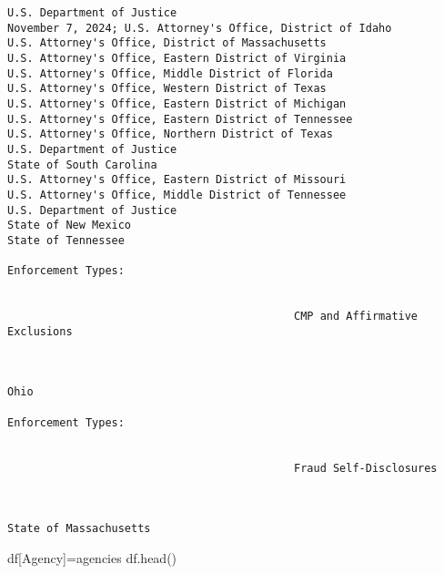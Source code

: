 \documentclass[
  letterpaper,
  DIV=11,
  numbers=noendperiod]{scrartcl}
\newenvironment{Shaded}{\begin{snugshade}}{\end{snugshade}}
\newcommand{\NormalTok}[1]{\textcolor[rgb]{0.00,0.23,0.31}{#1}}
\newcommand{\OperatorTok}[1]{\textcolor[rgb]{0.37,0.37,0.37}{#1}}
\newcommand{\StringTok}[1]{\textcolor[rgb]{0.13,0.47,0.30}{#1}}
\begin{document}
\begin{verbatim}
U.S. Department of Justice
November 7, 2024; U.S. Attorney's Office, District of Idaho
U.S. Attorney's Office, District of Massachusetts
U.S. Attorney's Office, Eastern District of Virginia
U.S. Attorney's Office, Middle District of Florida
U.S. Attorney's Office, Western District of Texas
U.S. Attorney's Office, Eastern District of Michigan
U.S. Attorney's Office, Eastern District of Tennessee
U.S. Attorney's Office, Northern District of Texas
U.S. Department of Justice
State of South Carolina
U.S. Attorney's Office, Eastern District of Missouri
U.S. Attorney's Office, Middle District of Tennessee
U.S. Department of Justice
State of New Mexico
State of Tennessee

Enforcement Types:


                                            CMP and Affirmative Exclusions
                                        


Ohio

Enforcement Types:


                                            Fraud Self-Disclosures
                                        


State of Massachusetts
\end{verbatim}

\begin{Shaded}
\begin{Highlighting}[]
\NormalTok{df[}\StringTok{\textquotesingle{}Agency\textquotesingle{}}\NormalTok{]}\OperatorTok{=}\NormalTok{agencies}
\NormalTok{df.head()}
\end{Highlighting}
\end{Shaded}
\end{document}
